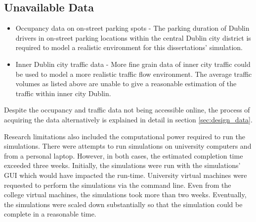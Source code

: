 \subsection*{Unavailable Data}
\begin{itemize}
    \item Occupancy data on on-street parking spots - The parking duration of Dublin drivers in on-street parking locations within the central Dublin city district is required to model a realistic environment for this dissertations' simulation.
    \item Inner Dublin city traffic data - More fine grain data of inner city traffic could be used to model a more realistic traffic flow environment. The average traffic volumes as listed above are unable to give a reasonable estimation of the traffic within inner city Dublin.
\end{itemize}

Despite the occupancy and traffic data not being accessible online, the process of acquiring the data alternatively is explained in detail in section \ref{sec:design_data}.

Research limitations also included the computational power required to run the simulations. There were attempts to run simulations on university computers and from a personal laptop. However, in both cases, the estimated completion time exceeded three weeks. Initially, the simulations were run with the simulations' GUI which would have impacted the run-time. University virtual machines were requested to perform the simulations via the command line. Even from the college virtual machines, the simulations took more than two weeks. Eventually, the simulations were scaled down substantially so that the simulation could be complete in a reasonable time.